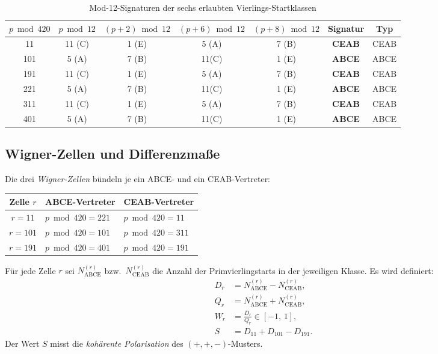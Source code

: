 \documentclass[12pt, a4paper]{article}
\begin{document}
\begin{table}[h]
\centering
\caption{Mod-12-Signaturen der sechs erlaubten Vierlings-Startklassen}
\label{tab:signaturen}
\begin{tabular}{ccccccc}
\toprule
$p \bmod 420$ & $p \bmod 12$ & $(p{+}2)\bmod 12$ & $(p{+}6)\bmod 12$ & $(p{+}8)\bmod 12$ & Signatur & Typ \\
\midrule
11  & 11 (C) & 1 (E) & 5 (A) & 7 (B) & \textcolor{ceab}{\textbf{CEAB}} & CEAB \\
101 & 5  (A) & 7 (B) & 11(C) & 1 (E) & \textcolor{abce}{\textbf{ABCE}} & ABCE \\
191 & 11 (C) & 1 (E) & 5 (A) & 7 (B) & \textcolor{ceab}{\textbf{CEAB}} & CEAB \\
221 & 5  (A) & 7 (B) & 11(C) & 1 (E) & \textcolor{abce}{\textbf{ABCE}} & ABCE \\
311 & 11 (C) & 1 (E) & 5 (A) & 7 (B) & \textcolor{ceab}{\textbf{CEAB}} & CEAB \\
401 & 5  (A) & 7 (B) & 11(C) & 1 (E) & \textcolor{abce}{\textbf{ABCE}} & ABCE \\
\bottomrule
\end{tabular}
\end{table}

\subsection{Wigner-Zellen und Differenzmaße}

Die drei \emph{Wigner-Zellen} bündeln je ein ABCE- und ein CEAB-Vertreter:

\begin{center}
\begin{tabular}{cll}
\toprule
Zelle $r$ & ABCE-Vertreter & CEAB-Vertreter \\
\midrule
$r = 11$  & $p \bmod 420 = 221$ & $p \bmod 420 = 11$ \\
$r = 101$ & $p \bmod 420 = 101$ & $p \bmod 420 = 311$ \\
$r = 191$ & $p \bmod 420 = 401$ & $p \bmod 420 = 191$ \\
\bottomrule
\end{tabular}
\end{center}

\medskip
Für jede Zelle $r$ sei $N_{\text{ABCE}}^{(r)}$ bzw.\ $N_{\text{CEAB}}^{(r)}$ die
Anzahl der Primvierlingstarts in der jeweiligen Klasse. Es wird definiert:
\begin{align}
D_r &= N_{\text{ABCE}}^{(r)} - N_{\text{CEAB}}^{(r)}, \label{eq:Dr}\\
Q_r &= N_{\text{ABCE}}^{(r)} + N_{\text{CEAB}}^{(r)}, \\
W_r &= \frac{D_r}{Q_r} \in [-1,\,1], \label{eq:Wr}\\
S   &= D_{11} + D_{101} - D_{191}. \label{eq:S}
\end{align}
Der Wert $S$ misst die \emph{kohärente Polarisation} des $(+,+,-)$-Musters.
\end{document}
